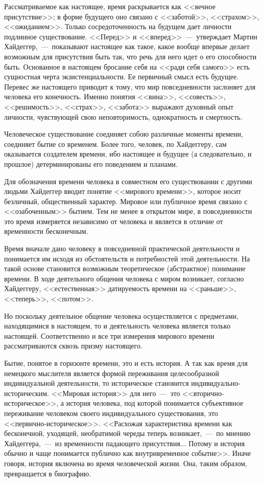 \documentclass{bmstu}
\begin{document}
Рассматриваемое как настоящее, время раскрывается как <<вечное присутствие>>; в форме будущего оно связано с <<заботой>>, <<страхом>>, <<ожиданием>>. Только сосредоточенность на будущем дает личности подлинное существование. <<Перед>> и <<вперед>>~---~утверждает Мартин Хайдеггер,~---~показывают настоящее как такое, какое вообще впервые делает возможным для присутствия быть так, что речь для него идет о его способности быть. Основанное в настоящем бросание себя на <<ради себя самого>> есть сущностная черта экзистенциальности. Ее первичный смысл есть будущее. Перевес же настоящего приводит к тому, что мир повседневности заслоняет для человека его конечность. Именно понятия <<вина>>, <<совесть>>, <<решимость>>, <<страх>>, <<забота>> выражают духовный опыт личности, чувствующей свою неповторимость, однократность и смертность.

Человеческое существование соединяет собою различные моменты времени, соединяет бытие со временем. Более того, человек, по Хайдеггеру, сам оказывается создателем времени, ибо настоящее и будущее (а следовательно, и прошлое) детерминированы его поведением и планами.

Для обозначения времени человека в совместном его существовании с другими людьми Хайдеггер вводит понятие <<мирового времени>>, которое носит безличный, общественный характер. Мировое или публичное время связано с <<озабоченным>> бытием. Тем не менее в открытом мире, в повседневности это время измеряется независимо от человека и является в отличие от временности бесконечным.

Время вначале дано человеку в повседневной практической деятельности и понимается им исходя из обстоятельств и потребностей этой деятельности. На такой основе становится возможным теоретическое (абстрактное) понимание времени. В ходе деятельного общения человека с миром возникает, согласно Хайдеггеру, <<естественная>> датируемость времени на <<раньше>>, <<теперь>>, <<потом>>.

Но поскольку деятельное общение человека осуществляется с предметами, находящимися в настоящем, то и деятельность человека является только настоящей. Соответственно и все три измерения мирового времени рассматриваются сквозь призму настоящего.

Бытие, понятое в горизонте времени, это и есть история. А так как время для немецкого мыслителя является формой переживания целесообразной индивидуальной деятельности, то историческое становится индивидуально-историческим. <<Мировая история>> для него~---~это <<вторично-историческое>>, а история человека, под которой понимается субъективное переживание человеком своего индивидуального существования, это <<первично-историческое>>. <<Расхожая характеристика времени как бесконечной, уходящей, необратимой череды теперь возникает,~---~по мнению Хайдеггера,~---~из временности падающего присутствия... Потому и история обычно и чаще понимается публично как внутривременное событие>>. Иначе говоря, история включена во время человеческой жизни. Она, таким образом, превращается в биографию.
\end{document}
